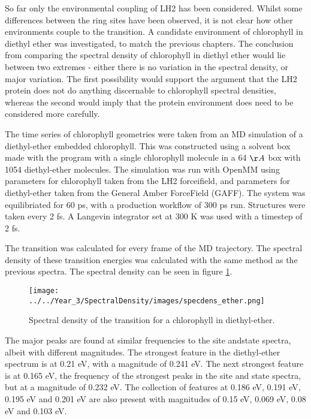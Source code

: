 So far only the environmental coupling of LH2 has been considered. Whilst some differences
between the ring sites have been observed, it is not clear how other environments 
couple to the \Qy transition. A candidate environment of chlorophyll in diethyl 
ether was investigated, to match the previous chapters. The conclusion from comparing
the spectral density of chlorophyll in diethyl ether would lie between two extremes
- either there is no variation in the spectral density, or major variation. The first
possibility would support the argument that the LH2 protein does not do anything 
discernable to chlorophyll spectral densities, whereas the second would imply that
the protein environment does need to be considered more carefully.

The time series of chlorophyll geometries were taken from an MD simulation of a 
diethyl-ether embedded chlorophyll. This was constructed using a solvent box made
with the  program with a single chlorophyll  molecule in a 64 $\AA{}$
box with 1054 diethyl-ether molecules. The simulation was run with OpenMM using
parameters for chlorophyll taken from the LH2 forceifield, and parameters for diethyl-ether
taken from the General Amber ForceField (GAFF). The system was equilibriated for 
60 ps, with a production workflow of 300 ps run. Structures were taken every 2 fs.
A Langevin integrator set at 300 K was used with a timestep of 2 fs.

The \Qy transition was calculated for every frame of the MD trajectory. The spectral
density of these transition energies was calculated with the same method as the 
previous spectra. The spectral density can be seen in figure \ref{fig:specdens_ether}.

\begin{figure}
    \centering
    \texttt{[image: ../../Year\_3/SpectralDensity/images/specdens\_ether.png]}
    \label{fig:specdens_ether}
    \caption{Spectral density of the \Qy transition for a chlorophyll in diethyl-ether.}
\end{figure}

The major peaks are found at similar frequencies to the site andstate spectra, albeit
with different magnitudes. The strongest feature in the diethyl-ether spectrum is
at 0.21 eV, with a magnitude of 0.241 eV. The next strongest feature is at 0.165 
eV, the frequency of the strongest peaks in the site and state spectra, but at a
magnitude of 0.232 eV. The collection of features at 0.186 eV, 0.191 eV, 0.195 eV
and 0.201 eV are also present with magnitudes of 0.15 eV, 0.069 eV, 0.08 eV and 
0.103 eV.


